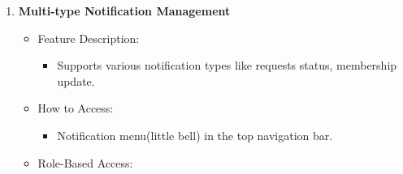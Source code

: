 \begin{enumerate}
      \begin{itemize}
      \item
        Feature Description:
    
        \begin{itemize}
        \item
          Users can create and reply to forum posts to facilitate
          discussion.
        \end{itemize}
      \item
        How to Access:
    
        \begin{itemize}
        \item
          Click on "Forums" in the Navbar to access related functions.
        \end{itemize}
      \item
        Role-Based Access:
    
        \begin{itemize}
        \item
          Logged-in users can post and reply in their own name, Club Manager
          can post forum in the name of the club.
        \end{itemize}
      \item
        Business Goal:
    
        \begin{itemize}
        \item
          Promotes communication and knowledge sharing.
        \end{itemize}
      \end{itemize}
    \item
      \textbf{Multi-type Notification Management}
    
      \begin{itemize}
      \item
        Feature Description:
    
        \begin{itemize}
        \item
          Supports various notification types like requests status,
          membership update.
        \end{itemize}
      \item
        How to Access:
    
        \begin{itemize}
        \item
          Notification menu(little bell) in the top navigation bar.
        \end{itemize}
      \item
        Role-Based Access:
    

\end{itemize}
\end{enumerate}

